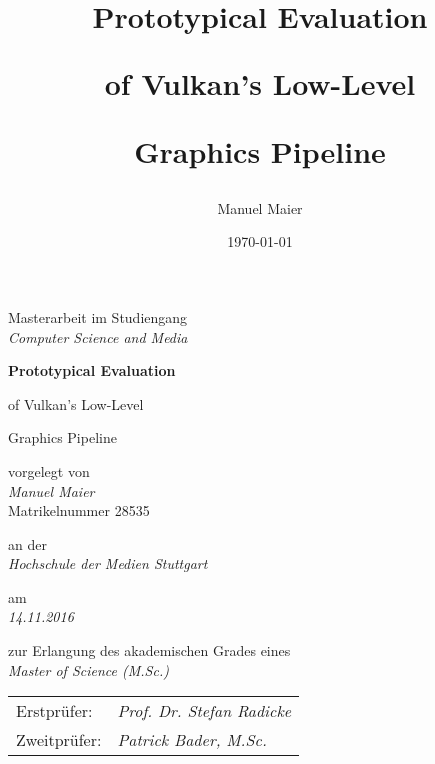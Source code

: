 \documentclass{scrreprt}
\begin{document}

  {
    \begin{titlepage}
      \begin{centering}

        \large

        Masterarbeit im Studiengang \\ \textit{\Large Computer Science and Media}

        \vspace{\fill}

        {\fontsize{2.4em}{0}\selectfont\bfseries
          Prototypical Evaluation \par of Vulkan's Low-Level \par Graphics Pipeline
        }

        \vspace{\fill}

        vorgelegt von \\ \textit{\Large Manuel Maier} \\ Matrikelnummer 28535

        an der \\ \textit{\Large Hochschule der Medien Stuttgart}

        am \\ \textit{\Large 14.11.2016}

        zur Erlangung des akademischen Grades eines \\ \textit{\Large Master of Science (M.Sc.)}

      \end{centering}

      \vspace{\fill}

      \begin{tabu}{ll}
        Erstprüfer:  & \textit{Prof. Dr. Stefan Radicke} \\
        Zweitprüfer: & \textit{Patrick Bader, M.Sc.}
      \end{tabu}

    \end{titlepage}
  }
  {
    \titlehead{}
    \subject{Master's Thesis \\ Computer Science and Media \\ Hochschule der Medien Stuttgart}
    \title{Prototypical Evaluation \par of Vulkan's Low-Level \par Graphics Pipeline}
    \author{Manuel Maier}
    \date{\today}
    \publishers
    {
      Supervisors \\
      \textbf{Prof. Dr. Stefan Radicke}\\
      \textbf{Patrick Bader, M.Sc.}
    }
    \maketitle
  }
\end{document}
